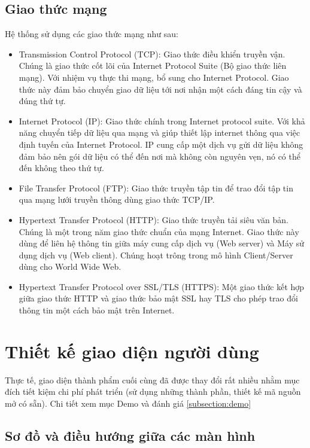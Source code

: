 \documentclass[a4paper, 12pt]{article}
\begin{document}
\subsection{Giao thức mạng}

Hệ thống sử dụng các giao thức mạng như sau:
\begin{itemize}
	\item Transmission Control Protocol (TCP): Giao thức điều khiển truyền vận. Chúng là giao thức cốt lõi của Internet Protocol Suite (Bộ giao thức liên mạng). Với nhiệm vụ thực thi mạng, bổ sung cho Internet Protocol. Giao thức này đảm bảo chuyển giao dữ liệu tới nơi nhận một cách đáng tin cậy và đúng thứ tự.
	\item Internet Protocol (IP): Giao thức chính trong Internet protocol suite. Với khả năng chuyển tiếp dữ liệu qua mạng và giúp thiết lập internet thông qua việc định tuyến  của Internet Protocol. IP cung cấp một dịch vụ gửi dữ liệu không đảm bảo  nên gói dữ liệu có thể đến nơi mà không còn nguyên vẹn, nó có thể đến không theo thứ tự.
	\item File Transfer Protocol (FTP): Giao thức truyền tập tin để trao đổi tập tin qua mạng lưới truyền thông dùng giao thức TCP/IP.
	\item Hypertext Transfer Protocol (HTTP): Giao thức truyền tải siêu văn bản. Chúng là một trong năm giao thức chuẩn của mạng Internet. Giao thức này dùng để liên hệ thông tin giữa máy cung cấp dịch vụ (Web server) và Máy sử dụng dịch vụ (Web client). Chúng hoạt trông trong mô hình Client/Server dùng cho World Wide Web.
	\item Hypertext Transfer Protocol over SSL/TLS (HTTPS): Một giao thức kết hợp giữa giao thức HTTP và giao thức bảo mật SSL hay TLS cho phép trao đổi thông tin một cách bảo mật trên Internet.
\end{itemize}
\clearpage

\section{Thiết kế giao diện người dùng}
Thực tế, giao diện thành phẩm cuối cùng đã được thay đổi rất nhiều nhằm mục đích tiết kiệm chi phí phát triển (sử dụng những thành phần, thiết kế mã nguồn mở có sẵn). Chi tiết xem mục Demo và đánh giá \ref{subsection:demo}
\subsection{Sơ đồ và điều hướng giữa các màn hình}
\end{document}
